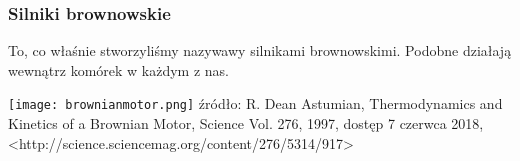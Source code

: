 \documentclass[10pt]{beamer}
\begin{document}
	\begin{frame}
		\frametitle{Silniki brownowskie}
		\begin{minipage}{1\textwidth}
		To, co właśnie stworzyliśmy nazywawy silnikami brownowskimi. Podobne działają wewnątrz komórek w każdym z nas.
		\end{minipage}
		\begin{minipage}{1\textwidth}
		\vspace{0.2cm}
		\Centering
		\texttt{[image: brownianmotor.png]}
		\vspace{0.2cm}
		\break
		źródło: R. Dean Astumian, Thermodynamics and Kinetics of a Brownian Motor, Science Vol. 276, 1997, dostęp 7 czerwca 2018, <http://science.sciencemag.org/content/276/5314/917>
		\end{minipage}
	\end{frame}
\end{document}
